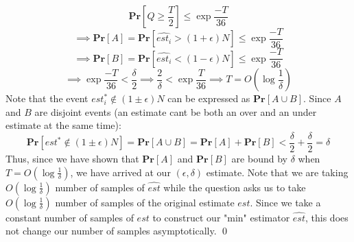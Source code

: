 \documentclass[12pt]{article}
\begin{document}
\begin{solution}
\[
\textbf{Pr}[Q \geq \frac{T}{2}] \leq \exp{\frac{-T}{36}}
\]
\[
\implies \textbf{Pr}[A] = \textbf{Pr}[\hat{est_i} > (1 + \epsilon) N] \leq \exp{\frac{-T}{36}}
\]
\[
\implies \textbf{Pr}[B] =\textbf{Pr}[\hat{est_i} < (1 - \epsilon) N] \leq \exp{\frac{-T}{36}}
\]
\[
\implies \exp{\frac{-T}{36}} < \frac{\delta}{2} \implies \frac{2}{\delta} < \exp{\frac{T}{36}} \implies T = O(\log{\frac{1}{\delta}})
\]
Note that the event $est_i^* \notin (1 \pm \epsilon) N$ can be expressed as $\textbf{Pr}[A\cup B]$. Since $A$ and $B$ are disjoint events (an estimate cant be both an over and an under estimate at the same time):
\[
\textbf{Pr}[est^* \notin (1 \pm \epsilon) N] = \textbf{Pr}[A\cup B] = \textbf{Pr}[A] + \textbf{Pr}[B] < \frac{\delta}{2} +\frac{\delta}{2} = \delta
\]
Thus, since we have shown that $\textbf{Pr}[A]$ and $\textbf{Pr}[B]$ are bound by $\delta$ when $T = O(\log{\frac{1}{\delta}})$, we have arrived at our $(\epsilon,\delta)$ estimate. Note that we are taking $O(\log{\frac{1}{\delta}})$ number of samples of $\hat{est}$ while the question asks us to take $O(\log{\frac{1}{\delta}})$ number of samples of the original estimate $est$. Since we take a constant number of samples of $est$ to construct our "min" estimator $\hat{est}$, this does not change our number of samples asymptotically. \qed

\end{solution}
\end{document}
